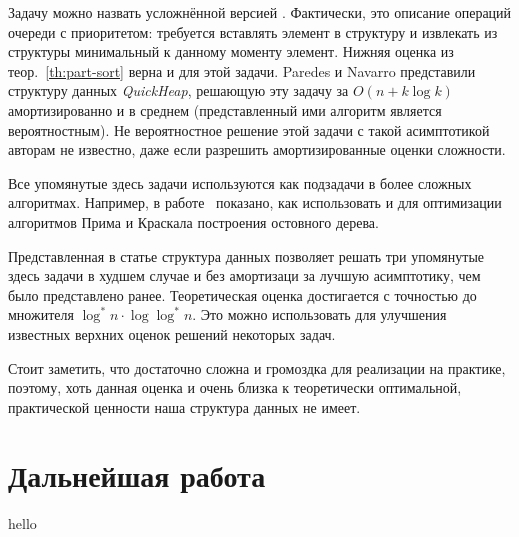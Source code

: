 Задачу \PriQ можно назвать усложнённой версией \PartSort. Фактически,
это описание операций очереди с приоритетом: требуется вставлять
элемент в структуру и извлекать из структуры минимальный к данному
моменту элемент. Нижняя оценка из теор.~\ref{th:part-sort} верна и
для этой задачи. Paredes и Navarro представили структуру данных
\emph{QuickHeap}\cite{quick-heap}, решающую эту задачу
за $O(n + k \log k)$ амортизированно и в среднем (представленный ими
алгоритм является вероятностным). Не вероятностное решение этой
задачи с такой асимптотикой авторам не известно, даже
если разрешить амортизированные оценки сложности.

Все упомянутые здесь задачи используются как подзадачи в более
сложных алгоритмах. Например, в работе~\cite{quick-heap} показано,
как использовать \IncSort и \PriQ для оптимизации алгоритмов
Прима и Краскала построения остовного дерева.

Представленная в статье структура данных \CH позволяет
решать три упомянутые здесь задачи в худшем случае и без амортизаци
за лучшую асимптотику, чем было представлено ранее. Теоретическая
оценка достигается с точностью до множителя $\log^*n \cdot \log \log^*n$.
Это можно использовать для улучшения известных верхних оценок
решений некоторых задач.

Стоит заметить, что \CH достаточно сложна и громоздка для реализации
на практике, поэтому, хоть данная оценка и очень близка к теоретически
оптимальной, практической ценности наша структура данных не имеет.

\section{Дальнейшая работа}
hello
